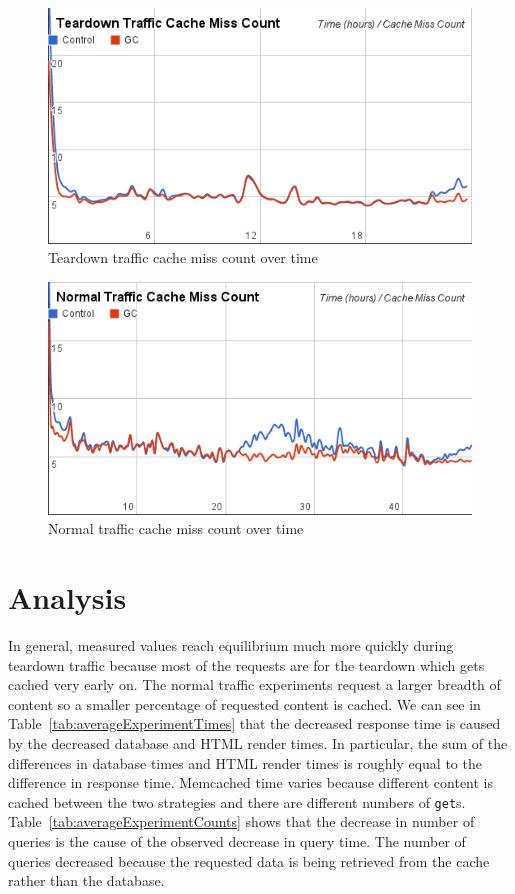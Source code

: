 \documentclass[12pt]{ucthesis}
\begin{document}
\begin{figure}[htp]
\centering
\includegraphics[width=\textwidth]{assets/teardownMissCountXTime.png}
\caption{Teardown traffic cache miss count over time}
\label{fig:teardownMissCountXTime}
\end{figure}
\begin{figure}[htp]
\centering
\includegraphics[width=\textwidth]{assets/normalMissCountXTime.png}
\caption{Normal traffic cache miss count over time}
\label{fig:normalMissCountXTime}
\end{figure}

\section{Analysis}
In general, measured values reach equilibrium much more quickly during teardown traffic because most of the requests are for the teardown which gets cached very early on.
The normal traffic experiments request a larger breadth of content so a smaller percentage of requested content is cached.
We can see in Table~\ref{tab:averageExperimentTimes} that the decreased response time is caused by the decreased database and HTML render times.
In particular, the sum of the differences in database times and HTML render times is roughly equal to the difference in response time.
\textsf{Memcached} time varies because different content is cached between the two strategies and there are different numbers of {\tt get}s.
Table~\ref{tab:averageExperimentCounts} shows that the decrease in number of queries is the cause of the observed decrease in query time.
The number of queries decreased because the requested data is being retrieved from the cache rather than the database.
\end{document}
